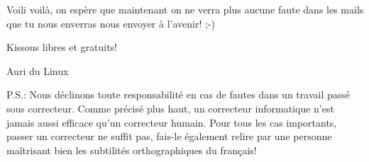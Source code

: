 \documentclass[12pt]{../fiche}
\begin{document}
Voili voilà, on espère que maintenant on ne verra plus aucune faute dans les mails que tu nous enverras nous envoyer à l'avenir! ;-)


Kissous libres et gratuits!


Auri du Linux


P.S.: Nous déclinons toute responsabilité en cas de fautes dans un travail passé sous correcteur. Comme précisé plus haut, un correcteur informatique n'est jamais aussi efficace qu'un correcteur humain. Pour tous les cas importants, passer un correcteur ne suffit pas, fais-le également relire par une personne maîtrisant bien les subtilités orthographiques du français!
\end{document}
